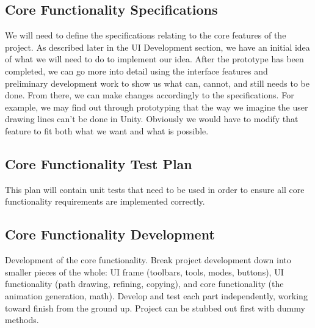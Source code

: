\subsection{Core Functionality Specifications}
We will need to define the specifications relating to the core features of the project. As described later in the UI Development section, we have an initial idea of what we will need to do to implement our idea. After the prototype has been completed, we can go more into detail using the interface features and preliminary development work to show us what can, cannot, and still needs to be done. From there, we can make changes accordingly to the specifications. For example, we may find out through prototyping that the way we imagine the user drawing lines can't be done in Unity. Obviously we would have to modify that feature to fit both what we want and what is possible.

\subsection{Core Functionality Test Plan}
This plan will contain unit tests that need to be used in order to ensure all core functionality requirements are implemented correctly.

\subsection{Core Functionality Development}
Development of the core functionality. Break project development down into smaller pieces of the whole: UI frame (toolbars, tools, modes, buttons), UI functionality (path drawing, refining, copying), and core functionality (the animation generation, math). Develop and test each part independently, working toward finish from the ground up. Project can be stubbed out first with dummy methods.
